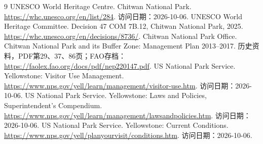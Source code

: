\documentclass[UTF8,fontset=fandol,12pt,a4paper]{ctexart}
\begin{document}
\FloatBarrier
\begin{thebibliography}{9}
 UNESCO World Heritage Centre. Chitwan National Park. \url{https://whc.unesco.org/en/list/284}. 访问日期：2026-10-06.
 UNESCO World Heritage Committee. Decision 47 COM 7B.12, Chitwan National Park, 2025. \url{https://whc.unesco.org/en/decisions/8736/}.
 Chitwan National Park Office. Chitwan National Park and its Buffer Zone: Management Plan 2013--2017. 历史资料，PDF第29、37、86页；FAO存档：\url{https://faolex.fao.org/docs/pdf/nep220147.pdf}.
 US National Park Service. Yellowstone: Visitor Use Management. \url{https://www.nps.gov/yell/learn/management/visitor-use.htm}. 访问日期：2026-10-06.
 US National Park Service. Yellowstone: Laws and Policies, Superintendent's Compendium. \url{https://www.nps.gov/yell/learn/management/lawsandpolicies.htm}. 访问日期：2026-10-06.
 US National Park Service. Yellowstone: Current Conditions. \url{https://www.nps.gov/yell/planyourvisit/conditions.htm}. 访问日期：2026-10-06.
\end{thebibliography}
\end{document}
